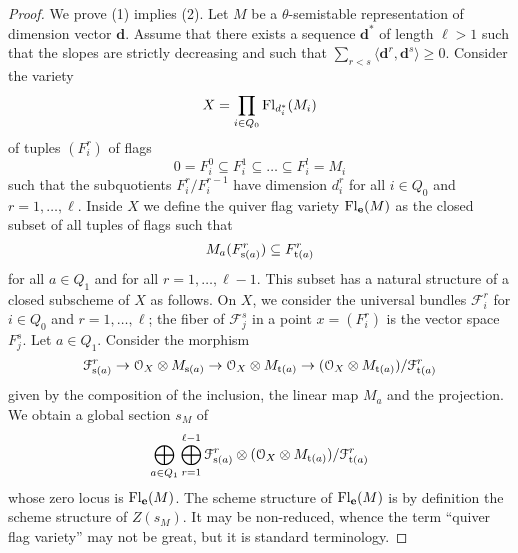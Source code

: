 \documentclass[a4paper]{article}
\begin{document}
\begin{proof}
    We prove (1) implies (2). Let $M$ be a $\theta$-semistable representation of dimension vector $\mathbf{d}$. Assume that there exists a sequence $\mathbf{d}^*$ of length $\ell > 1$ such that the slopes are strictly decreasing and such that $\sum_{r < s} \langle \mathbf{d}^r,\mathbf{d}^s \rangle \geq 0$. Consider the variety
    \[
        X = \prod_{i \in Q_0} \operatorname{Fl}_{d_i^*}(M_i)    
    \]
    of tuples $(F_i^r)$ of flags
    \[
        0 = F_i^0 \subseteq F_i^1 \subseteq \ldots \subseteq F_i^l = M_i     
    \]
    such that the subquotients $F_i^r/F_i^{r-1}$ have dimension $d_i^r$ for all $i \in Q_0$ and $r = 1,\ldots,\ell$. Inside $X$ we define the quiver flag variety $\operatorname{Fl}_\mathbf{e}(M)$ as the closed subset of all tuples of flags such that 
    \[
        M_a(F_{\mathrm{s}(a)}^r) \subseteq F_{\mathrm{t}(a)}^r     
    \]
    for all $a \in Q_1$ and for all $r=1,\ldots,\ell-1$. This subset has a natural structure of a closed subscheme of $X$ as follows. On $X$, we consider the universal bundles $\mathcal{F}_i^r$ for $i \in Q_0$ and $r=1,\ldots,\ell$; the fiber of $\mathcal{F}_j^s$ in a point $x = (F_i^r)$ is the vector space $F_j^s$. Let $a \in Q_1$. Consider the morphism
    \[
        \mathcal{F}_{\mathrm{s}(a)}^r \to \mathcal{O}_X \otimes M_{\mathrm{s}(a)} \to \mathcal{O}_X \otimes M_{\mathrm{t}(a)} \to (\mathcal{O}_X \otimes M_{\mathrm{t}(a)})/\mathcal{F}_{\mathrm{t}(a)}^r     
    \]
    given by the composition of the inclusion, the linear map $M_a$ and the projection. We obtain a global section $s_M$  of 
    \[
        \bigoplus_{a \in Q_1} \bigoplus_{r=1}^{\ell-1} \mathcal{F}_{\mathrm{s}(a)}^r \otimes (\mathcal{O}_X \otimes M_{\mathrm{t}(a)})/\mathcal{F}_{\mathrm{t}(a)}^r
    \]
    whose zero locus is $\operatorname{Fl}_\mathbf{e}(M)$. The scheme structure of $\operatorname{Fl}_\mathbf{e}(M)$ is by definition the scheme structure of $Z(s_M)$. It may be non-reduced, whence the term ``quiver flag variety'' may not be great, but it is standard terminology.
\end{proof}

\end{document}
